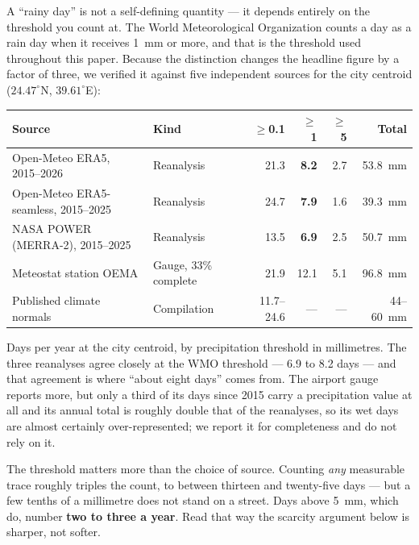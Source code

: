 \documentclass[11pt,a4paper]{article}
\begin{document}
\begin{notebox}
A ``rainy day'' is not a self-defining quantity --- it depends entirely on the
threshold you count at. The World Meteorological Organization counts a day as a
rain day when it receives \SI{1}{\milli\metre} or more, and that is the threshold
used throughout this paper. Because the distinction changes the headline figure by
a factor of three, we verified it against five independent sources for the city
centroid ($24.47^\circ$N, $39.61^\circ$E):

\smallskip
{\centering\footnotesize
\begin{tabular}{@{}llrrrr@{}}
\toprule
Source & Kind & $\ge$0.1 & $\ge$1 & $\ge$5 & Total \\
\midrule
Open-Meteo ERA5, 2015--2026 & Reanalysis & 21.3 & \textbf{8.2} & 2.7 & \SI{53.8}{\milli\metre} \\
Open-Meteo ERA5-seamless, 2015--2025 & Reanalysis & 24.7 & \textbf{7.9} & 1.6 & \SI{39.3}{\milli\metre} \\
NASA POWER (MERRA-2), 2015--2025 & Reanalysis & 13.5 & \textbf{6.9} & 2.5 & \SI{50.7}{\milli\metre} \\
Meteostat station OEMA & Gauge, 33\% complete & 21.9 & 12.1 & 5.1 & \SI{96.8}{\milli\metre} \\
Published climate normals & Compilation & 11.7--24.6 & --- & --- & 44--\SI{60}{\milli\metre} \\
\bottomrule
\end{tabular}
\par}

\smallskip
Days per year at the city centroid, by precipitation threshold in millimetres.
The three reanalyses agree closely at the WMO threshold --- 6.9 to 8.2 days ---
and that agreement is where ``about eight days'' comes from. The airport gauge
reports more, but only a third of its days since 2015 carry a precipitation value
at all and its annual total is roughly double that of the reanalyses, so its wet
days are almost certainly over-represented; we report it for completeness and do
not rely on it.

\smallskip
The threshold matters more than the choice of source. Counting \emph{any}
measurable trace roughly triples the count, to between thirteen and twenty-five
days --- but a few tenths of a millimetre does not stand on a street. Days above
\SI{5}{\milli\metre}, which do, number \textbf{two to three a year}. Read that way
the scarcity argument below is sharper, not softer.
\end{notebox}
\end{document}

